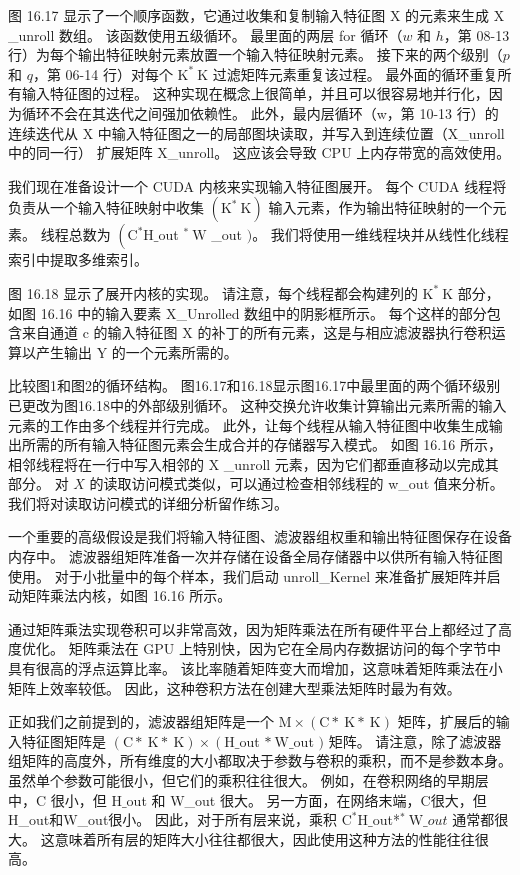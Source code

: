 图 16.17 显示了一个顺序函数，它通过收集和复制输入特征图 $\mathrm{X}$ 的元素来生成 $\mathrm{X}$ \_unroll 数组。 该函数使用五级循环。 最里面的两层 for 循环（$w$ 和 $h$，第 08-13 行）为每个输出特征映射元素放置一个输入特征映射元素。 接下来的两个级别（$p$ 和 $q$，第 06-14 行）对每个 $\mathrm{K}^{*} \mathrm{~K}$ 过滤矩阵元素重复该过程。 最外面的循环重复所有输入特征图的过程。 这种实现在概念上很简单，并且可以很容易地并行化，因为循环不会在其迭代之间强加依赖性。 此外，最内层循环（w，第 10-13 行）的连续迭代从 $\mathrm{X}$ 中输入特征图之一的局部图块读取，并写入到连续位置（X\_unroll 中的同一行） 扩展矩阵 X\_unroll。 这应该会导致 CPU 上内存带宽的高效使用。

我们现在准备设计一个 CUDA 内核来实现输入特征图展开。 每个 CUDA 线程将负责从一个输入特征映射中收集 $\left(\mathrm{K}^{*} \mathrm{~K}\right)$ 输入元素，作为输出特征映射的一个元素。 线程总数为 $\left(\mathrm{C}^{*} \mathrm{H} \_\right.$out ${ }^{*} \mathrm{~W}$ \_out $) $。 我们将使用一维线程块并从线性化线程索引中提取多维索引。

图 16.18 显示了展开内核的实现。 请注意，每个线程都会构建列的 $\mathrm{K}^{*} \mathrm{~K}$ 部分，如图 16.16 中的输入要素 X\_Unrolled 数组中的阴影框所示。 每个这样的部分包含来自通道 $\mathrm{c}$ 的输入特征图 $\mathrm{X}$ 的补丁的所有元素，这是与相应滤波器执行卷积运算以产生输出 Y 的一个元素所需的。

比较图1和图2的循环结构。 图16.17和16.18显示图16.17中最里面的两个循环级别已更改为图16.18中的外部级别循环。 这种交换允许收集计算输出元素所需的输入元素的工作由多个线程并行完成。 此外，让每个线程从输入特征图中收集生成输出所需的所有输入特征图元素会生成合并的存储器写入模式。 如图 16.16 所示，相邻线程将在一行中写入相邻的 $\mathrm{X}$ \_unroll 元素，因为它们都垂直移动以完成其部分。 对 $X$ 的读取访问模式类似，可以通过检查相邻线程的 w\_out 值来分析。 我们将对读取访问模式的详细分析留作练习。

一个重要的高级假设是我们将输入特征图、滤波器组权重和输出特征图保存在设备内存中。 滤波器组矩阵准备一次并存储在设备全局存储器中以供所有输入特征图使用。 对于小批量中的每个样本，我们启动 unroll\_Kernel 来准备扩展矩阵并启动矩阵乘法内核，如图 16.16 所示。

通过矩阵乘法实现卷积可以非常高效，因为矩阵乘法在所有硬件平台上都经过了高度优化。 矩阵乘法在 GPU 上特别快，因为它在全局内存数据访问的每个字节中具有很高的浮点运算比率。 该比率随着矩阵变大而增加，这意味着矩阵乘法在小矩阵上效率较低。 因此，这种卷积方法在创建大型乘法矩阵时最为有效。

正如我们之前提到的，滤波器组矩阵是一个 $\mathrm{M} \times(\mathrm{C} * \mathrm{~K} * \mathrm{~K})$ 矩阵，扩展后的输入特征图矩阵是 $(\mathrm{C} * \mathrm{~K} * \mathrm{~K}) \times\left(\mathrm{H} \_\right.$out $* \mathrm{~W} \_ $out $)$ 矩阵。 请注意，除了滤波器组矩阵的高度外，所有维度的大小都取决于参数与卷积的乘积，而不是参数本身。 虽然单个参数可能很小，但它们的乘积往往很大。 例如，在卷积网络的早期层中，$\mathrm{C}$ 很小，但 $\mathrm{H} \_$out 和 W\_out 很大。 另一方面，在网络末端，$\mathrm{C}$很大，但H\_out和W\_out很小。 因此，对于所有层来说，乘积 $\mathrm{C}^{*} \mathrm{H} \_$out*${ }^{*} \mathrm{~W} \_o u t$ 通常都很大。 这意味着所有层的矩阵大小往往都很大，因此使用这种方法的性能往往很高。

